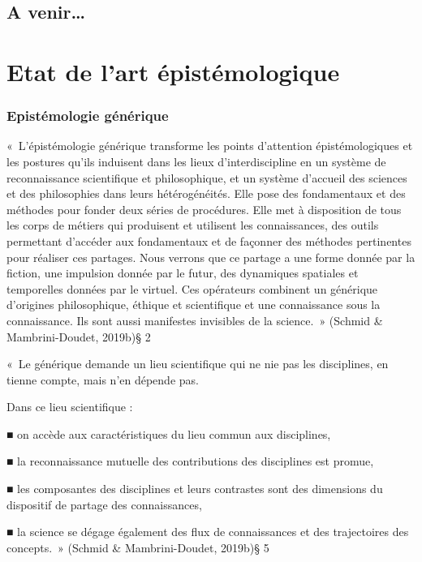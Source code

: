\documentclass[
  a4paper,
  DIV=11,
  numbers=noendperiod]{scrreprt}
\begin{document}
\section*{A venir\ldots{}}\label{a-venir}


\chapter{Etat de l'art épistémologique}\label{sec-etatArtEpistemo}

\subsection{Epistémologie
générique}\label{epistuxe9mologie-guxe9nuxe9rique}

«~L'épistémologie générique transforme les points d'attention
épistémologiques et les postures qu'ils induisent dans les lieux
d'interdiscipline en un système de reconnaissance scientifique et
philosophique, et un système d'accueil des sciences et des philosophies
dans leurs hétérogénéités. Elle pose des fondamentaux et des méthodes
pour fonder deux séries de procédures. Elle met à disposition de tous
les corps de métiers qui produisent et utilisent les connaissances, des
outils permettant d'accéder aux fondamentaux et de façonner des méthodes
pertinentes pour réaliser ces partages. Nous verrons que ce partage a
une forme donnée par la fiction, une impulsion donnée par le futur, des
dynamiques spatiales et temporelles données par le virtuel. Ces
opérateurs combinent un générique d'origines philosophique, éthique et
scientifique et une connaissance sous la connaissance. Ils sont aussi
manifestes invisibles de la science.~» (Schmid \& Mambrini-Doudet,
2019b)§ 2

«~Le générique demande un lieu scientifique qui ne nie pas les
disciplines, en tienne compte, mais n'en dépende pas.

Dans ce lieu scientifique :

■ on accède aux caractéristiques du lieu commun aux disciplines,

■ la reconnaissance mutuelle des contributions des disciplines est
promue,

■ les composantes des disciplines et leurs contrastes sont des
dimensions du dispositif de partage des connaissances,

■ la science se dégage également des flux de connaissances et des
trajectoires des concepts.~» (Schmid \& Mambrini-Doudet, 2019b)§ 5
\end{document}
